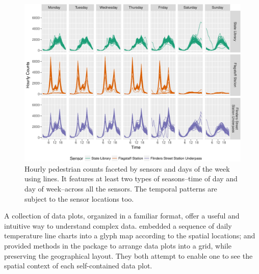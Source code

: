 \documentclass[article]{jss}
\theoremstyle{definition}
\theoremstyle{definition}
\theoremstyle{remark}
\begin{document}
\begin{CodeChunk}
\begin{figure}

{\centering \includegraphics[width=\textwidth]{figure/facet-time-1} 

}

\caption[Hourly pedestrian counts faceted by sensors and
days of the week using lines. It features at least two types of
seasons--time of day and day of week--across all the sensors. The
temporal patterns are subject to the sensor locations too.]{Hourly pedestrian counts faceted by sensors and
days of the week using lines. It features at least two types of
seasons--time of day and day of week--across all the sensors. The
temporal patterns are subject to the sensor locations too.}\label{fig:facet-time}
\end{figure}
\end{CodeChunk}






A collection of data plots, organized in a familiar format, offer a
useful and intuitive way to understand complex data.
\citet{Wickham2012glyph} embedded a sequence of daily temperature line
charts into a glyph map according to the spatial locations; and
\citet{R-geofacet} provided methods in the  package to
arrange data plots into a grid, while preserving the geographical
layout. They both attempt to enable one to see the spatial context of
each self-contained data plot.
\end{document}
